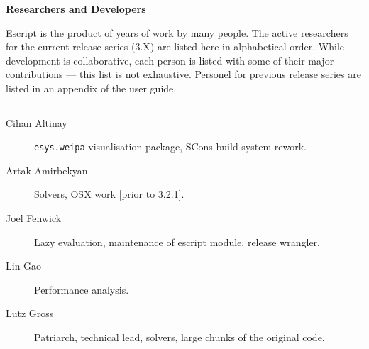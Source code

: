 \vbox{}
\vfill
\begin{center}
\textbf{\Large Researchers and Developers}
\vspace{0.5cm}

Escript is the product of years of work by many people.
The active researchers for the current release series (3.X) are listed here in alphabetical order.
While development is collaborative, each person is listed with some of their major contributions --- this list is not exhaustive.
Personel for previous release series are listed in an appendix of the user guide.

\vspace{1cm}
\hrule
\vspace{1cm}
\begin{description}
\item[Cihan Altinay] \texttt{esys.weipa} visualisation package, SCons build system rework.
\item[Artak Amirbekyan] Solvers, OSX work [prior to 3.2.1].
\item[Joel Fenwick] Lazy evaluation, maintenance of escript module, release wrangler.
\item[Lin Gao] Performance analysis.
\item[Lutz Gross] Patriarch, technical lead, solvers, large chunks of the original code.
\end{description}
\end{center}
\vfill
\pagebreak

